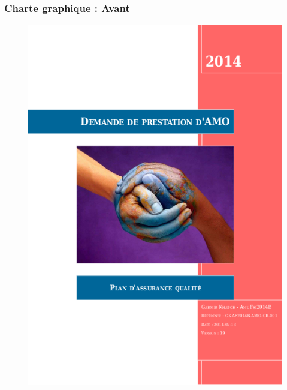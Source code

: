 \begin{frame}
\frametitle{Charte graphique : Avant}


\begin{figure}
   \begin{minipage}[c]{.4\linewidth}
      \includegraphics[width=\textwidth]{Images/cg_entete_avant.png}
   \end{minipage} \hfill
   \begin{minipage}[c]{.4\linewidth}

\end{minipage}
\end{figure}
\end{frame}
